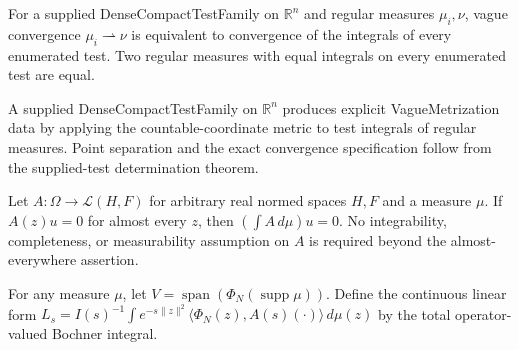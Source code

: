 \begin{lemma}
\label{lem:vague-determining-tests}

For a supplied DenseCompactTestFamily on $\mathbb R^n$ and regular measures $\mu_i,\nu$, vague convergence $\mu_i\rightharpoonup\nu$ is equivalent to convergence of the integrals of every enumerated test. Two regular measures with equal integrals on every enumerated test are equal.
\end{lemma}

\begin{definition}
\label{def:vague-metrization-from-tests}

A supplied DenseCompactTestFamily on $\mathbb R^n$ produces explicit VagueMetrization data by applying the countable-coordinate metric to test integrals of regular measures. Point separation and the exact convergence specification follow from the supplied-test determination theorem.
\end{definition}

\begin{lemma}
\label{lem:integral-operator-annihilation}

Let $A:\Omega\to\mathcal L(H,F)$ for arbitrary real normed spaces $H,F$ and a measure $\mu$. If $A(z)u=0$ for almost every $z$, then $(\int A\,d\mu)u=0$. No integrability, completeness, or measurability assumption on $A$ is required beyond the almost-everywhere assertion.
\end{lemma}

\begin{definition}
\label{def:feature-moment}

For any measure $\mu$, let $V=\operatorname{span}(\Phi_N(\operatorname{supp}\mu))$. Define the continuous linear form $L_s=I(s)^{-1}\int e^{-s\|z\|^2}\langle\Phi_N(z),A(s)(\cdot)\rangle\,d\mu(z)$ by the total operator-valued Bochner integral.
\end{definition}

